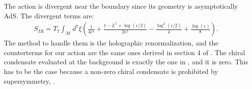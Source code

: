 The action is divergent near the boundary since its geometry is asymptotically AdS. The divergent terms are:
\begin{align}
 S_{IR} = T_7 \int_\mathcal{M} d^7\xi 
        \left( \frac{1}{4 \epsilon ^4} +\frac{1-L^2+\log \left(\epsilon/2\right)}{2 \epsilon ^2}-\frac{ \log ^2\left(\epsilon/2\right)}{4}+\frac{\log (\epsilon )}{8} \right).
\end{align}
The method to handle them is the holographic renormalization, and the counterterms for our action are the same ones derived in section 4 of \cite{Karch:2005ms}. The chiral condensate evaluated at the background is exactly the one in \cite{Karch:2005ms}, and it is zero. This has to be the case because a non-zero chiral condensate is prohibited by supersymmetry, \cite{Babington:2003vm}. 






